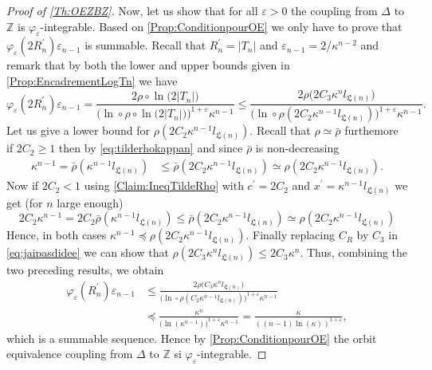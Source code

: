 \documentclass[english, 11pt, a4paper]{article}
\theoremstyle{definition}
\numberwithin{equation}{section}
\newcommand{\bZ}{\mathbb{Z}}
\newcommand{\BZ}{\Delta}
\newcommand{\RZ}{R^\prime}
\newcommand{\Landing}{\mathfrak{L}}
\newcommand{\rhoaff}{\bar{\rho}}
\newcommand{\CTn}{C_{3}}
\begin{document}
\begin{proof}[Proof of \cref{Th:OEZBZ}]
  Now, let us show that for all $\varepsilon>0$ the coupling from $\BZ$ to $\bZ$ is
  $\varphi_{\varepsilon}$-integrable. Based on \cref{Prop:ConditionpourOE} we only
  have to prove that $\varphi_{\varepsilon}(2\RZ_n)\varepsilon_{n-1}$ is summable.
  Recall that $\RZ_n=|T_n|$ and $\varepsilon_{n-1}=2/\kappa^{n-2}$ and remark
  that by both the lower and upper bounds given in \cref{Prop:EncadrementLogTn}
  we have
  \begin{equation*}
    \varphi_{\varepsilon}(2\RZ_n)\varepsilon_{n-1}
    =\frac{2 \rho\circ\ln\big(2|T_n|\big)}%
    {\Big( \ln\circ \rho\circ \ln\big(2|T_n| \big)\Big)^{1+\varepsilon}\kappa^{n-1}}
    \leq \frac{2 \rho\big(2\CTn \kappa^nl_{\Landing(n)}\big)}%
    {\Big(\ln\circ\rho\left(2C_2 \kappa^{n-1}l_{\Landing(n)}\right)\Big)^{1+\varepsilon}\kappa^{n-1}}.
  \end{equation*}
  Let us give a lower bound for $\rho\left(2C_2
    \kappa^{n-1}l_{\Landing(n)}\right)$. Recall that $\rho \simeq \rhoaff$
  furthemore if $2C_2\geq 1$ then by \cref{eq:tilderhokappan} and since
  $\rhoaff$ is non-decreasing  
  \begin{align*}
    \kappa^{n-1}=\rhoaff\left(\kappa^{n-1}l_{\Landing(n)}\right)
    &\leq
    \rhoaff\left(2C_2 \kappa^{n-1}l_{\Landing(n)}\right)%
    \simeq \rho\left(2C_2 \kappa^{n-1}l_{\Landing(n)}\right).   
  \end{align*}
  Now if $2C_2 <1$ using \cref{Claim:IneqTildeRho} with $c^\prime=2C_2$ and
  $x^\prime =\kappa^{n-1}l_{\Landing(n)}$ we get (for $n$ large enough)
  \begin{equation*}
    2C_2 \kappa^{n-1} =2C_2 \rhoaff(\kappa^{n-1}l_{\Landing(n)})
    \leq \rhoaff(2C_2\kappa^{n-1}l_{\Landing(n)})
   \simeq \rho\left( 2C_2 \kappa^{n-1}l_{\Landing(n)}\right)
  \end{equation*}
  Hence, in both cases $\kappa^{n-1} \preccurlyeq \rho( 2C_2
  \kappa^{n-1}l_{\Landing(n)})$. Finally replacing $C_R$ by $\CTn$ in 
  \cref{eq:jaipasdidee} we can show that $\rho
  \left(2\CTn \kappa^nl_{\Landing(n)}\right) \leq 2\CTn \kappa^n$. Thus,
  combining the two preceding results, we obtain
  \begin{align*}
    \varphi_{\varepsilon}(\RZ_n)\varepsilon_{n-1}
    &\leq \frac{2 \rho\big(\CTn \kappa^nl_{\Landing(n)}\big)}%
    {\Big( \ln\circ\rho\left(C_2 \kappa^{n-1}l_{\Landing(n)}\right)\Big)^{1+\varepsilon}\kappa^{n-1}}\\
    &\preccurlyeq\frac{\kappa^{n}}%
      {{\Big(\ln\left(\kappa^{n-1}\right)\Big)}^{1+\varepsilon}\kappa^{n-1}}
      =\frac{\kappa}{{\left((n-1)\ln(\kappa)\right)}^{1+\varepsilon}},
  \end{align*}
  which is a summable sequence. Hence by
  \cref{Prop:ConditionpourOE} the orbit equivalence coupling from $\BZ$ to $\bZ$
  si $\varphi_{\varepsilon}$-integrable.
\end{proof}
\end{document}
